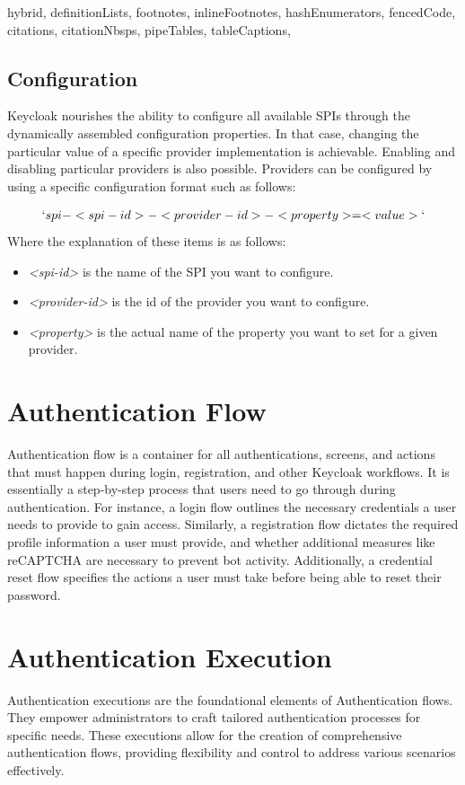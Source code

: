 \documentclass[
  digital,     %
  oneside,     %
  nosansbold,  %
  nocolorbold, %
  lof,         %
  lot,         %
]{fithesis4}
\begin{document}
\begin{markdown*}{%
  hybrid,
  definitionLists,
  footnotes,
  inlineFootnotes,
  hashEnumerators,
  fencedCode,
  citations,
  citationNbsps,
  pipeTables,
  tableCaptions,
}
\subsection{Configuration}
Keycloak nourishes the ability to configure all available SPIs through the dynamically assembled configuration properties.
In that case, changing the particular value of a specific provider implementation is achievable.
Enabling and disabling particular providers is also possible.\cite{keycloak-spi-config}
\newline
\newline
Providers can be configured by using a specific configuration format such as follows:

\begin{align}
    `spi-<spi-id>-<provider-id>-<property>=<value>`
\end{align}
\newline
\newline
Where the explanation of these items is as follows:
\begin{itemize}
    \item \textit{<spi-id>} is the name of the SPI you want to configure.
    \item \textit{<provider-id>} is the id of the provider you want to configure.
    \item \textit{<property>} is the actual name of the property you want to set for a given provider.
\end{itemize}

\section{Authentication Flow}
Authentication flow is a container for all authentications, screens, and actions that must happen during login, registration, and other Keycloak workflows.
It is essentially a step-by-step process that users need to go through during authentication.
For instance, a login flow outlines the necessary credentials a user needs to provide to gain access.
Similarly, a registration flow dictates the required profile information a user must provide, and whether additional measures like reCAPTCHA are necessary to prevent bot activity.
Additionally, a credential reset flow specifies the actions a user must take before being able to reset their password. \cite{keycloak-auth-flows}

\newpage
\section{Authentication Execution}
Authentication executions are the foundational elements of Authentication flows.
They empower administrators to craft tailored authentication processes for specific needs.
These executions allow for the creation of comprehensive authentication flows, providing flexibility and control to address various scenarios effectively.


\end{markdown*}
\end{document}
